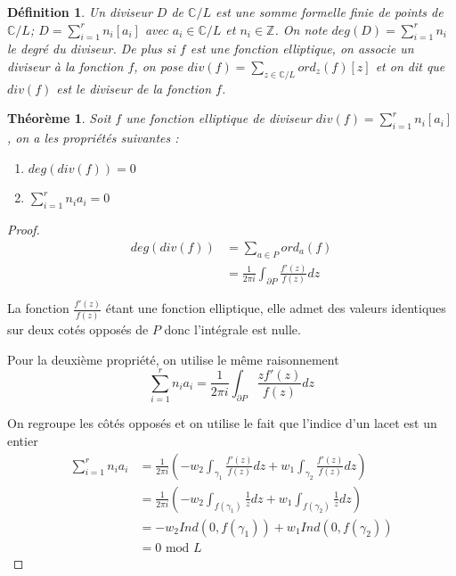\documentclass{article}
\newtheorem{definition}{Définition}
\newtheorem{theoreme}{Théorème}
\begin{document}
\begin{definition}
Un diviseur $D$ de $\mathbb{C}/L$ est une somme formelle finie de points de $\mathbb{C}/L$; 
$D=\sum_{i=1}^{r}{n_{i}[a_{i}]}$ avec $a_{i}\in \mathbb{C}/L$ et $n_{i}\in \mathbb{Z}$.
On note 
$deg(D) = \sum_{i=1}^{r}{n_{i}}$ le degré du diviseur.
De plus si $f$ est une fonction elliptique, on associe un diviseur à la fonction $f$, on pose 
$div(f)=\sum_{z\in \mathbb{C}/L}{ord_{z}(f)[z]}$  et on dit que $div(f)$ est le diviseur de la fonction $f$.
\end{definition}

\begin{theoreme}
Soit $f$ une fonction elliptique de diviseur $div(f) = \sum_{i=1}^{r}{n_{i}[a_{i}]}$,
on a les propriétés suivantes :
\begin{enumerate}
\item $deg(div(f)) = 0$
\item $\sum_{i=1}^{r}{n_{i}a_{i}} = 0$
\end{enumerate}
\end{theoreme}

\begin{proof}

\begin{align*}
deg(div(f)) &= \sum_{a\in P}{ord_{a}(f)} \\
			&= \frac{1}{2\pi i} \int_{\partial P} \frac{f'(z)}{f(z)} dz
\end{align*}

La fonction $\frac{f'(z)}{f(z)}$ étant une fonction elliptique, elle admet des valeurs identiques sur deux cotés
opposés de $P$ donc l'intégrale est nulle.

Pour la deuxième propriété, on utilise le même raisonnement
\begin{equation*}
\sum_{i=1}^{r}{n_{i}a_{i}} = \frac{1}{2\pi i} \int_{\partial P} \frac{zf'(z)}{f(z)} dz
\end{equation*}

On regroupe les côtés opposés et on utilise le fait que l'indice d'un lacet est un entier
\begin{align*}
\sum_{i=1}^{r}{n_{i}a_{i}} &= \frac{1}{2\pi i}(-w_{2}\int_{\gamma_{1}} \frac{f'(z)}{f(z)} dz
+ w_{1}\int_{\gamma_{2}} \frac{f'(z)}{f(z)} dz) \\
	&= \frac{1}{2\pi i}(-w_{2}\int_{f(\gamma_{1})} \frac{1}{z} dz + w_{1}\int_{f(\gamma_{2})} \frac{1}{z} dz) \\
	&= -w_{2}Ind(0, f(\gamma_{1})) + w_{1}Ind(0, f(\gamma_{2})) \\
	& = 0\text{ mod }L
\end{align*}
\end{proof}
\end{document}
